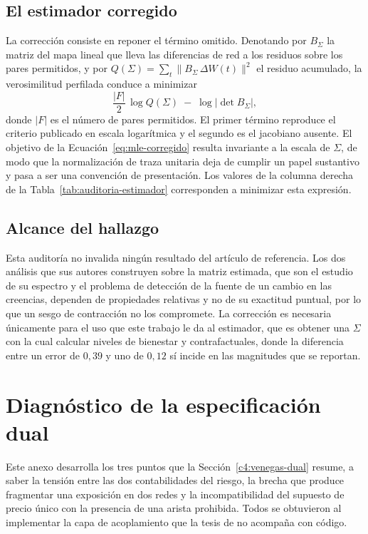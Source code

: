 \subsection{El estimador corregido}
\label{anexo:auditoria-correccion}

La corrección consiste en reponer el término omitido. Denotando por
$B_\Sigma$ la matriz del mapa lineal que lleva las diferencias de red a los
residuos sobre los pares permitidos, y por $Q(\Sigma)=\sum_t \|B_\Sigma\,
\Delta W(t)\|^2$ el residuo acumulado, la verosimilitud perfilada conduce a
minimizar
\begin{equation}
\label{eq:mle-corregido}
    \frac{|F|}{2}\,\log Q(\Sigma) \;-\; \log\left|\det B_\Sigma\right| ,
\end{equation}
donde $|F|$ es el número de pares permitidos. El primer término reproduce el
criterio publicado en escala logarítmica y el segundo es el jacobiano ausente.
El objetivo de la Ecuación~\eqref{eq:mle-corregido} resulta invariante a la
escala de $\Sigma$, de modo que la normalización de traza unitaria deja de
cumplir un papel sustantivo y pasa a ser una convención de presentación. Los
valores de la columna derecha de la Tabla~\ref{tab:auditoria-estimador}
corresponden a minimizar esta expresión.

\subsection{Alcance del hallazgo}
\label{anexo:auditoria-alcance}

Esta auditoría no invalida ningún resultado del artículo de referencia. Los dos
análisis que sus autores construyen sobre la matriz estimada, que son el estudio
de su espectro y el problema de detección de la fuente de un cambio en las
creencias, dependen de propiedades relativas y no de su exactitud puntual, por
lo que un sesgo de contracción no los compromete. La corrección es necesaria
únicamente para el uso que este trabajo le da al estimador, que es obtener una
$\Sigma$ con la cual calcular niveles de bienestar y contrafactuales, donde la
diferencia entre un error de $0{,}39$ y uno de $0{,}12$ sí incide en las
magnitudes que se reportan.

\section{Diagnóstico de la especificación dual}
\label{anexo:dual}

Este anexo desarrolla los tres puntos que la Sección~\ref{c4:venegas-dual}
resume, a saber la tensión entre las dos contabilidades del riesgo, la brecha
que produce fragmentar una exposición en dos redes y la incompatibilidad del
supuesto de precio único con la presencia de una arista prohibida. Todos se
obtuvieron al implementar la capa de acoplamiento que la tesis de
 no acompaña con código.

